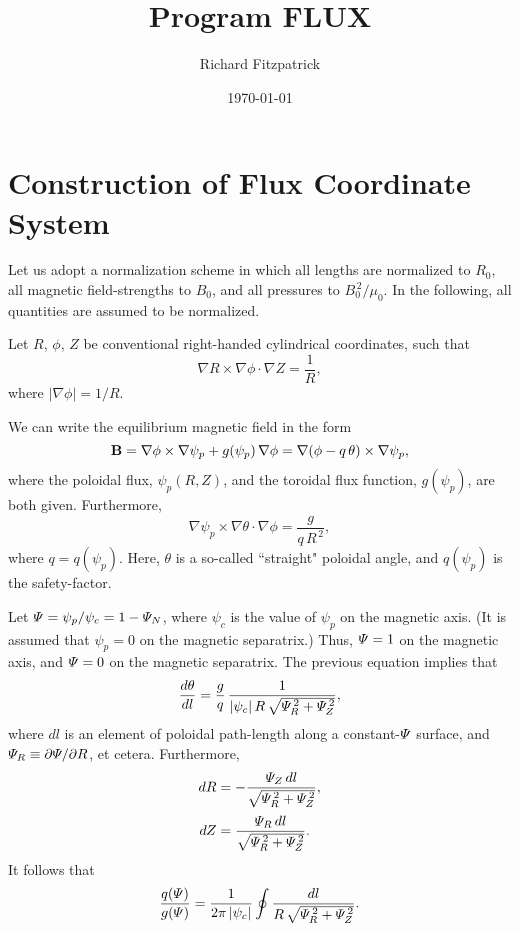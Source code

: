 \documentclass[notitlepage,12pt]{article}
\title{\bf Program FLUX}
\date{\today}
\author{Richard Fitzpatrick}
\begin{document}
\maketitle

\section{Construction of Flux Coordinate System}
Let us adopt
a normalization scheme in which all lengths are normalized to $R_0$, all magnetic field-strengths to $B_0$, and all pressures to $B_0^{\,2}/\mu_0$. In the following, all quantities are assumed to be normalized. 

Let $R$, $\phi$, $Z$ be conventional right-handed cylindrical coordinates, such that 
\begin{equation}
\nabla R\times\nabla\phi\cdot\nabla Z =\frac{1}{R},
\end{equation}
where $|\nabla\phi|= 1/R$. 

We can write the equilibrium magnetic field in the form 
\begin{equation}
{\bf B} =\nabla\phi\times \nabla\psi_p +g(\psi_p)\,\nabla\phi=\nabla(\phi-q\,\theta)\times \nabla\psi_p,
\end{equation}
where the poloidal flux, $\psi_p(R,Z)$,  and the toroidal flux function, $g(\psi_p)$, are both given. Furthermore, 
\begin{equation}
\nabla\psi_p\times \nabla\theta\cdot\nabla\phi = \frac{g}{q\,R^{\,2}},
\end{equation}
where $q=q(\psi_p)$. Here,  $\theta$ is a so-called  ``straight" poloidal angle, and $q(\psi_p)$ is the safety-factor. 

Let ${\mit\Psi}=\psi_p/\psi_c = 1-{\mit\Psi}_N$, where $\psi_c$ is the value
of $\psi_p$ on the magnetic axis. (It is assumed that $\psi_p=0$ on the magnetic separatrix.)  Thus, ${\mit\Psi}=1$ on the
magnetic axis, and ${\mit\Psi}=0$ on the magnetic separatrix. 
The previous equation implies that
\begin{equation}
\frac{d\theta}{dl} = \frac{g}{q}\,\frac{1}{|\psi_c|\,R\,\sqrt{{\mit\Psi}_R^{\,2}+{\mit\Psi}_Z^{\,2}}},
\end{equation}
where $dl$ is an element of poloidal path-length  along a constant-${\mit\Psi}$ surface, and ${\mit\Psi}_R\equiv \partial{\mit\Psi}/\partial R$, et cetera. Furthermore,
\begin{align}
dR &= -\frac{{\mit\Psi}_Z\,dl}{\sqrt{{\mit\Psi}_R^{\,2}+{\mit\Psi}_Z^{\,2}}},\\[0.5ex]
dZ&= \frac{{\mit\Psi}_R\,dl}{\sqrt{{\mit\Psi}_R^{\,2}+{\mit\Psi}_Z^{\,2}}}.
\end{align}
It follows that
\begin{equation}
\frac{q({\mit\Psi})}{g({\mit\Psi})} = \frac{1}{2\pi\,|\psi_c|}\oint \frac{dl}{R\,\sqrt{{\mit\Psi}_R^{\,2}+{\mit\Psi}_Z^{\,2}}}.
\end{equation}
\end{document}
